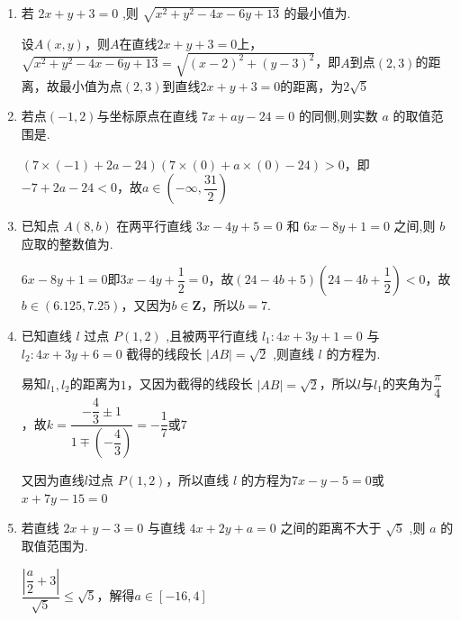 \begin{enumerate}
    \item 若 ${2x} + y + 3 = 0$ ,则 $\sqrt{{x}^{2} + {y}^{2} - {4x} - {6y} + {13}}$ 的最小值为.
    \begin{jieda}
        设$A(x, y)$，则$A$在直线${2x} + y + 3 = 0$上，$\sqrt{{x}^{2} + {y}^{2} - {4x} - {6y} + {13}} = \sqrt{(x-2)^2+(y-3)^2}$，即$A$到点$(2, 3)$的距离，故最小值为点$(2, 3)$到直线${2x} + y + 3 = 0$的距离，为$2\sqrt{5}$
    \end{jieda}

    \item 若点$(-1,2)$与坐标原点在直线 ${7x} + {ay} - {24} = 0$ 的同侧,则实数 $a$ 的取值范围是.
    \begin{jieda}
        $(7 \times (-1) + 2a - {24})(7 \times (0) + a\times(0) - {24}) > 0$，即$-7 + 2a - {24} < 0$，故$a \in \left(-\infty, \dfrac{31}{2}\right)$
    \end{jieda}

    \item 已知点 $A\left( {8,b}\right)$ 在两平行直线 ${3x} - {4y} + 5 = 0$ 和 ${6x} - {8y} + 1 = 0$ 之间,则 $b$ 应取的整数值为.
    \begin{jieda}
        ${6x} - {8y} + 1 = 0$即$3x-4y+\dfrac{1}{2} = 0$，故$(24-4b+5)\left(24-4b+\dfrac{1}{2}\right) < 0$，故$b \in (6.125, 7.25)$，又因为$b \in \mathbf{Z}$，所以$b = 7$.
    \end{jieda}

    \item 已知直线 $l$ 过点 $P\left( {1,2}\right)$ ,且被两平行直线 ${l}_{1} : {4x} + {3y} + 1 = 0$ 与 ${l}_{2} : {4x} + {3y} + 6 = 0$ 截得的线段长 $\left| {AB}\right|  = \sqrt{2}$ ,则直线 $l$ 的方程为.
    \begin{jieda}
        易知$l_1, l_2$的距离为$1$，又因为截得的线段长 $\left| {AB}\right|  = \sqrt{2}$，所以$l$与$l_1$的夹角为$\dfrac{\pi}{4}$，故$k = \dfrac{-\dfrac{4}{3} \pm 1}{1 \mp \left(-\dfrac{4}{3}\right)} = -\dfrac{1}{7}$或$7$

        又因为直线$l$过点 $P\left( {1,2}\right)$，所以直线 $l$ 的方程为$7x-y-5=0$或$x+7y-15=0$
    \end{jieda}

    \item 若直线 ${2x} + y - 3 = 0$ 与直线 ${4x} + {2y} + a = 0$ 之间的距离不大于 $\sqrt{5}$ ,则 $a$ 的取值范围为\blkda{$[-16, 4]$}.
    \begin{jieda}
        $\dfrac{\left|\dfrac{a}{2}+3\right|}{\sqrt{5}} \leq \sqrt{5}$，解得$a \in [-16, 4]$
    \end{jieda}


\end{enumerate}
